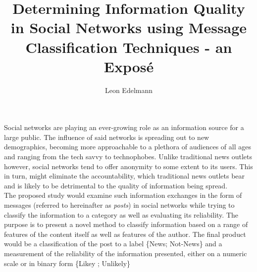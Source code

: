 \documentclass[12pt]{article}
\begin{document}
\title{Determining Information Quality \\ in Social Networks using Message \\ Classification Techniques - an Expos\'e}
\author{Leon Edelmann}

\maketitle
\section*{}
Social networks are playing an ever-growing role as an information source for a large public. The influence of said networks is spreading out to new demographics, becoming more approachable to a plethora of audiences of all ages and ranging from the tech savvy to technophobes. Unlike traditional news outlets however, social networks tend to offer anonymity to some extent to its users. This in turn, might eliminate the accountability, which traditional news outlets bear and is likely to be detrimental to the quality of information being spread.
\\

The proposed study would examine such information exchanges in the form of messages (referred to hereinafter as \textit{posts}) in social networks while trying to classify the information to a category as well as evaluating its reliability. The purpose is to present a novel method to classify information based on a range of features of the content itself as well as  features of the author. The final product would be a classification of the post to a label  \{News; Not-News\} and a measurement of the reliability of the information presented, either on a numeric scale or in binary form \{Likey ; Unlikely\}
\\
\end{document}

